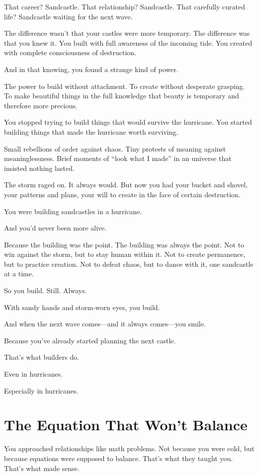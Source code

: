 \documentclass[12pt,letterpaper]{book}
\begin{document}
That career? Sandcastle. That relationship? Sandcastle. That carefully curated life? Sandcastle waiting for the next wave.

The difference wasn't that your castles were more temporary. The difference was that you knew it. You built with full awareness of the incoming tide. You created with complete consciousness of destruction.

And in that knowing, you found a strange kind of power.

The power to build without attachment. To create without desperate grasping. To make beautiful things in the full knowledge that beauty is temporary and therefore more precious.

You stopped trying to build things that would survive the hurricane. You started building things that made the hurricane worth surviving.

Small rebellions of order against chaos. Tiny protests of meaning against meaninglessness. Brief moments of ``look what I made'' in an universe that insisted nothing lasted.

The storm raged on. It always would. But now you had your bucket and shovel, your patterns and plans, your will to create in the face of certain destruction.

You were building sandcastles in a hurricane.

And you'd never been more alive.

Because the building was the point. The building was always the point. Not to win against the storm, but to stay human within it. Not to create permanence, but to practice creation. Not to defeat chaos, but to dance with it, one sandcastle at a time.

So you build. Still. Always.

With sandy hands and storm-worn eyes, you build.

And when the next wave comes—and it always comes—you smile.

Because you've already started planning the next castle.

That's what builders do.

Even in hurricanes.

Especially in hurricanes.

\chapter{The Equation That Won't Balance}

You approached relationships like math problems. Not because you were cold, but because equations were supposed to balance. That's what they taught you. That's what made sense.
\end{document}
